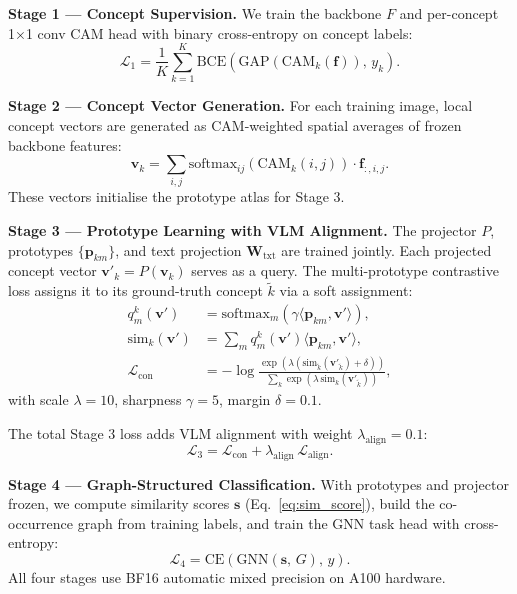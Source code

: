 \documentclass{article}
\begin{document}
\textbf{Stage 1 — Concept Supervision.}
We train the backbone $F$ and per-concept 1×1 conv CAM head with binary cross-entropy on concept labels:
\begin{equation}
    \mathcal{L}_1 = \frac{1}{K} \sum_{k=1}^K \text{BCE}(\text{GAP}(\text{CAM}_k(\mathbf{f})),\, y_k).
\end{equation}

\textbf{Stage 2 — Concept Vector Generation.}
For each training image, local concept vectors are generated as CAM-weighted spatial averages of frozen backbone features:
\begin{equation}
    \mathbf{v}_k = \sum_{i,j} \text{softmax}_{ij}(\text{CAM}_k(i,j)) \cdot \mathbf{f}_{:,i,j}.
\end{equation}
These vectors initialise the prototype atlas for Stage 3.

\textbf{Stage 3 — Prototype Learning with VLM Alignment.}
The projector $P$, prototypes $\{\mathbf{p}_{km}\}$, and text projection $\mathbf{W}_{\text{txt}}$ are trained jointly. Each projected concept vector $\mathbf{v}'_k = P(\mathbf{v}_k)$ serves as a query. The multi-prototype contrastive loss assigns it to its ground-truth concept $\tilde{k}$ via a soft assignment:
\begin{align}
    q_m^k(\mathbf{v}') &= \text{softmax}_m\!\left(\gamma \langle \mathbf{p}_{km},\mathbf{v}' \rangle\right), \\
    \text{sim}_k(\mathbf{v}') &= \sum_m q_m^k(\mathbf{v}') \langle \mathbf{p}_{km},\mathbf{v}' \rangle, \\
    \mathcal{L}_\text{con} &= -\log \frac{\exp\!\left(\lambda(\text{sim}_{\tilde{k}}(\mathbf{v}'_{\tilde{k}}) + \delta)\right)}{\sum_{k} \exp\!\left(\lambda\, \text{sim}_k(\mathbf{v}'_{\tilde{k}})\right)},
    \label{eq:contrastive}
\end{align}
with scale $\lambda=10$, sharpness $\gamma=5$, margin $\delta=0.1$.

The total Stage 3 loss adds VLM alignment with weight $\lambda_\text{align}=0.1$:
\begin{equation}
    \mathcal{L}_3 = \mathcal{L}_\text{con} + \lambda_\text{align}\, \mathcal{L}_\text{align}.
    \label{eq:stage3}
\end{equation}

\textbf{Stage 4 — Graph-Structured Classification.}
With prototypes and projector frozen, we compute similarity scores $\mathbf{s}$ (Eq.~\ref{eq:sim_score}), build the co-occurrence graph from training labels, and train the GNN task head with cross-entropy:
\begin{equation}
    \mathcal{L}_4 = \text{CE}\!\left(\text{GNN}(\mathbf{s},\, G),\, y\right).
\end{equation}
All four stages use BF16 automatic mixed precision on A100 hardware.
\end{document}
